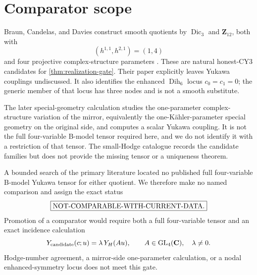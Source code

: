 \section{Comparator scope}
\label{sec:comparators}

Braun, Candelas, and Davies construct smooth quotients by
\(\operatorname{Dic}_3\) and \(\mathbf Z_{12}\), both with
\[
 (h^{1,1},h^{2,1})=(1,4)
\]
and four projective complex-structure parameters
\cite{BraunCandelasDavies2010}.  These are natural honest-CY3 candidates for
\cref{thm:realization-gate}.  Their paper explicitly leaves Yukawa
couplings undiscussed.  It also identifies the enhanced
\(\operatorname{Dih}_6\) locus \(c_0=c_1=0\); the generic member of that
locus has three nodes and is not a smooth substitute.

The later special-geometry calculation
\cite{BraunCandelasDelaOssa2015} studies the one-parameter
complex-structure variation of the mirror, equivalently the
one-K\"ahler-parameter special geometry on the original side, and computes a
scalar Yukawa coupling.  It is not the full four-variable B-model tensor
required here, and we do not identify it with a restriction of that tensor.
The small-Hodge catalogue
\cite{CandelasConstantinMishra2018} records the candidate families but does
not provide the missing tensor or a uniqueness theorem.

A bounded search of the primary literature located no published full
four-variable B-model Yukawa tensor for either quotient.  We therefore make
no named comparison and assign the exact status
\[
 \boxed{\text{\rm NOT-COMPARABLE-WITH-CURRENT-DATA}.}
\]
Promotion of a comparator would require both a full four-variable tensor and
an exact incidence calculation
\[
 Y_{\mathrm{candidate}}(c;u)
 =\lambda\,Y_H(Au),\qquad
 A\in\operatorname{GL}_4(\mathbf C),\quad\lambda\ne0.
\]
Hodge-number agreement, a mirror-side one-parameter calculation, or a nodal
enhanced-symmetry locus does not meet this gate.
